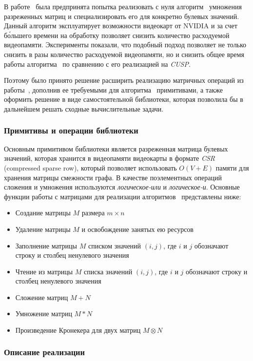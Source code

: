 В работе~\cite{inproceedings:cfqp_matrix_with_single_source} была предпринята попытка реализовать с нуля алгоритм~\cite{inproceedings:spgemm_mem_saving_for_nvidia} умножения разреженных матриц и специализировать его для конкретно булевых значений. Данный алгоритм эксплуатирует возможности  видеокарт от NVIDIA и за счет б\'ольшего времени на обработку позволяет снизить количество расходуемой видеопамяти. Эксперименты показали, что подобный подход позволяет не только снизить в разы количество расходуемой видеопамяти, но и снизить общее время работы алгоритма~\cite{inproceedings:matrix_cfpq} по сравнению с его реализацией на \textit{CUSP}. 

Поэтому было принято решение расширить реализацию матричных операций из работы~\cite{inproceedings:cfqp_matrix_with_single_source}, дополнив ее требуемыми для алгоритма~\cite{inbook:kronecker_cfpq_adbis} примитивами, а также оформить решение в виде самостоятельной библиотеки, которая позволила бы в дальнейшем решать сходные вычислительные задачи.

\subsubsection{Примитивы и операции библиотеки}

Основным примитивом библиотеки является разреженная матрица булевых значений, которая хранится в видеопамяти видеокарты в формате \textit{CSR} (compressed sparse row), который позволяет использовать $O(V + E)$ памяти для хранения матрицы смежности графа. В качестве поэлементных операций сложения и умножения используются \textit{логическое-или} и \textit{логическое-и}. Основные функции работы с матрицами для реализации алгоритмов~\cite{inproceedings:cfqp_matrix_with_single_source, inbook:kronecker_cfpq_adbis} представлены ниже:

\begin{itemize}
    \item Создание матрицы $M$ размера $m \times n$
    \item Удаление матрицы $M$ и освобождение занятых ею ресурсов
    \item Заполнение матрицы $M$ списком значений $(i, j)$, где $i$ и $j$ обозначают строку и столбец ненулевого значения
    \item Чтение из матрицы $M$ списка значений $(i, j)$, где $i$ и $j$ обозначают строку и столбец ненулевого значения
    \item Сложение матриц $M + N$
    \item Умножение матриц $M * N$
    \item Произведение Кронекера для двух матриц $M \otimes N$
\end{itemize}

\subsubsection{Описание реализации}